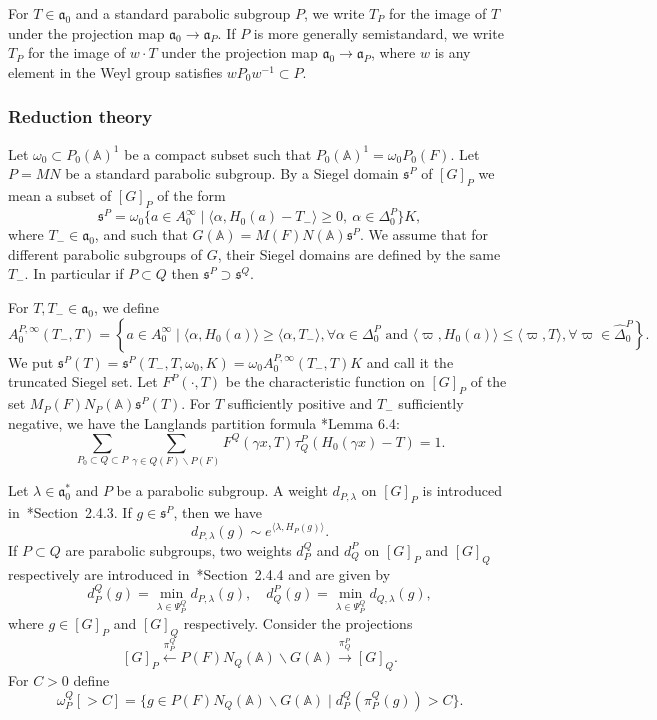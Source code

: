 \documentclass[letterpaper,11pt]{amsart}
\newcommand{\fa}{\mathfrak{a}}
\newcommand{\fs}{\mathfrak{s}}
\newcommand{\bA}{\mathbb{A}}
\newcommand{\bs}{\backslash}
\newcommand{\<}{\negthickspace}
\theoremstyle{definition}
\theoremstyle{plain}
\theoremstyle{remark}
\numberwithin{equation}{section}
\begin{document}
For $T \in \fa_0$ and a standard parabolic subgroup $P$, we write $T_P$ for the image of $T$ under the projection map $\fa_0 \to \fa_P$. If $P$ is more generally semistandard, we write $T_P$ for the image of $w \cdot T$ under the projection map $\fa_0 \to \fa_P$, where $w$ is any element in the Weyl group satisfies $wP_0w^{-1} \subset P$.

\subsubsection{Reduction theory}

Let $\omega_0 \subset P_0(\bA)^1$ be a compact subset such that $P_0(\bA)^1
= \omega_0 P_0(F)$. Let $P=MN$ be a standard parabolic subgroup. By a Siegel domain $\fs^P$ of $[G]_P$ we mean a subset of
$[G]_P$ of the form
    \[
    \fs^P = \omega_0 \{ a \in A_0^\infty \mid
    \langle \alpha, H_0(a) - T_- \rangle \geq 0, \ \alpha \in \Delta_0^P \} K,
    \]
where $T_- \in \fa_0$, and such that $G(\bA) = M(F)N(\bA)\fs^P$. We
assume that for different parabolic subgroups of $G$, their Siegel domains
are defined by the same $T_-$. In particular if $P \subset Q$ then $\fs^P
\supset \fs^Q$.

For $T,T_- \in \fa_0$, we define
    \[
    A_0^{P,\infty}(T_-,T) =
    \left\{ a \in A_0^\infty \mid \langle \alpha,H_0(a) \rangle
    \ge \langle \alpha,T_- \rangle, \forall \alpha \in \Delta_0^P
    \text{ and } \langle \varpi,H_0(a) \rangle \le \langle \varpi,T \rangle,
    \forall \varpi \in \widehat{\Delta}_0^P \right\}.
    \]
 We put $\fs^P(T) = \fs^P(T_-,T,\omega_0,K) = \omega_0
A_0^{P,\infty}(T_-,T)K$ and call it the truncated Siegel set. Let
$F^P(\cdot,T)$ be the characteristic function on $[G]_P$ of the set
$M_P(F)N_P(\bA) \fs^P(T)$. For $T$ sufficiently positive and $T_-$
sufficiently negative, we have the Langlands partition formula \cite{Arthur3}*{Lemma 6.4}:
    \begin{equation}    \label{eq:langlands_partition}
    \sum_{P_0 \subset Q \subset P} \sum_{\gamma \in Q(F) \backslash P(F)}
    F^Q(\gamma x,T) \tau_Q^P(H_0(\gamma x)-T)=1.
    \end{equation}

Let $\lambda \in \fa_0^*$ and $P$ be a parabolic subgroup. A weight $d_{P, \lambda}$ on $[G]_P$ is introduced in~\cite{BPCZ}*{Section~2.4.3}. If $g \in \fs^P$, then we have
    \[
    d_{P, \lambda}(g) \sim e^{\langle \lambda, H_P(g) \rangle}.
    \]
If $P \subset Q$ are parabolic subgroups, two weights $d_P^Q$ and $d_Q^P$ on $[G]_P$ and $[G]_Q$ respectively are introduced in~\cite{BPCZ}*{Section~2.4.4} and are given by
    \[
    d_{P}^Q(g) = \min_{\lambda \in \Psi_P^Q}
    d_{P, \lambda}(g), \quad
    d_{Q}^P(g) = \min_{\lambda \in \Psi_P^Q}
    d_{Q, \lambda}(g),
    \]
where $g \in [G]_P$ and $[G]_Q$ respectively. Consider the projections
    \begin{equation}    \label{eq:projections_P_Q}
    [G]_P \xleftarrow{\pi_P^Q}
    P(F) N_Q(\bA) \bs G(\bA) \xrightarrow{\pi_Q^P} [G]_Q.
    \end{equation}
For $C>0$ define
    \[
    \omega_P^Q[>C] = \{ g \in P(F) N_Q(\bA) \bs G(\bA)
    \mid d_P^Q(\pi_P^Q(g)) > C\}.
    \]
\end{document}
